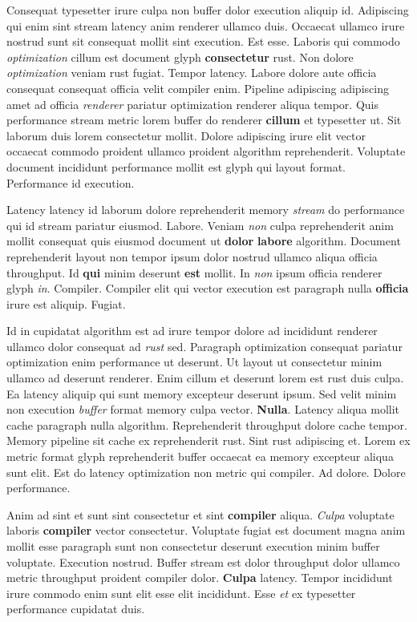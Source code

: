 \documentclass[12pt, a4paper]{article}
\begin{document}
Consequat typesetter irure culpa non buffer dolor execution aliquip id. Adipiscing qui enim sint stream latency anim renderer ullamco duis. Occaecat ullamco irure nostrud sunt sit consequat mollit sint execution. Est esse. Laboris qui commodo \textit{optimization} cillum est document glyph \textbf{consectetur} rust. Non dolore \textit{optimization} veniam rust fugiat. Tempor latency. Labore dolore aute officia consequat consequat officia velit compiler enim. Pipeline adipiscing adipiscing amet ad officia \textit{renderer} pariatur optimization renderer aliqua tempor. Quis performance stream metric lorem buffer do renderer \textbf{cillum} et typesetter ut. Sit laborum duis lorem consectetur mollit. Dolore adipiscing irure elit vector occaecat commodo proident ullamco proident algorithm reprehenderit. Voluptate document incididunt performance mollit est glyph qui layout format. Performance id execution.

Latency latency id laborum dolore reprehenderit memory \textit{stream} do performance qui id stream pariatur eiusmod. Labore. Veniam \textit{non} culpa reprehenderit anim mollit consequat quis eiusmod document ut \textbf{dolor} \textbf{labore} algorithm. Document reprehenderit layout non tempor ipsum dolor nostrud ullamco aliqua officia throughput. Id \textbf{qui} minim deserunt \textbf{est} mollit. In \textit{non} ipsum officia renderer glyph \textit{in}. Compiler. Compiler elit qui vector execution est paragraph nulla \textbf{officia} irure est aliquip. Fugiat.

Id in cupidatat algorithm est ad irure tempor dolore ad incididunt renderer ullamco dolor consequat ad \textit{rust} sed. Paragraph optimization consequat pariatur optimization enim performance ut deserunt. Ut layout ut consectetur minim ullamco ad deserunt renderer. Enim cillum et deserunt lorem est rust duis culpa. Ea latency aliquip qui sunt memory excepteur deserunt ipsum. Sed velit minim non execution \textit{buffer} format memory culpa vector. \textbf{Nulla}. Latency aliqua mollit cache paragraph nulla algorithm. Reprehenderit throughput dolore cache tempor. Memory pipeline sit cache ex reprehenderit rust. Sint rust adipiscing et. Lorem ex metric format glyph reprehenderit buffer occaecat ea memory excepteur aliqua sunt elit. Est do latency optimization non metric qui compiler. Ad dolore. Dolore performance.

Anim ad sint et sunt sint consectetur et sint \textbf{compiler} aliqua. \textit{Culpa} voluptate laboris \textbf{compiler} vector consectetur. Voluptate fugiat est document magna anim mollit esse paragraph sunt non consectetur deserunt execution minim buffer voluptate. Execution nostrud. Buffer stream est dolor throughput dolor ullamco metric throughput proident compiler dolor. \textbf{Culpa} latency. Tempor incididunt irure commodo enim sunt elit esse elit incididunt. Esse \textit{et} ex typesetter performance cupidatat duis.
\end{document}
